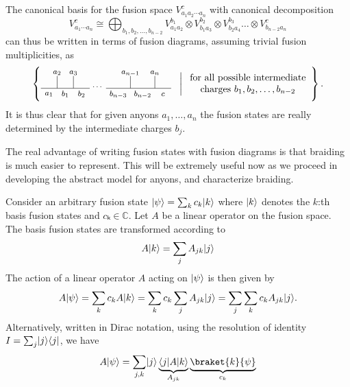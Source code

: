 The canonical basis for the fusion space $V_{a_1a_2\cdots a_n}^c$ with canonical decomposition
\begin{equation}
  V_{a_1 \cdots a_n}^c \cong \bigoplus_{b_1,b_2,\ldots,b_{n-2}} V_{a_1a_2}^{b_1} \otimes V_{b_1 a_3}^{b_2} \otimes V_{b_2 a_4}^{b_3} \ldots \otimes V_{b_{n-2} a_n}^c
\end{equation}
can thus be written in terms of fusion diagrams, assuming trivial fusion multiplicities, as
\begin{equation}
  \left\{
  \begin{tikzpicture}[scale=0.3,font=\footnotesize,anchor=mid,baseline={([yshift=-.5ex]current bounding box.center)}]
    \node at (0, -0.6) {$a_1$};
    \node at (1, 2) {$a_2$};
    \node at (3, 2) {$a_3$};
    \node at (10, 2) {$a_{n-1}$};
    \node at (13, 2) {$a_n$};
%
    \draw (1, 0) to (1, 1.5);
    \draw (3, 0) to (3, 1.5);
%
    \draw (10, 0) to (10, 1.5);
    \draw (13, 0) to (13, 1.5);
%
    \draw (-1, 0) to (5, 0);
    \draw (7, 0) to (15, 0);
%
    \node at (2, -0.7) {$b_1$};
    \node at (4, -0.7) {$b_2$};
    \node at (6, 0.2) {$\cdots$};
%
    \node at (8.5, -0.7) {$b_{n-3}$};
    \node at (11.5, -0.7) {$b_{n-2}$};
    \node at (14, -0.7) {$c$};
  \end{tikzpicture}
  \;\;\;\bigg|\; \begin{array}{c}\text{for all possible intermediate} \\ \text{charges $b_1, b_2, \ldots, b_{n-2}$}\end{array}
  \right\}.
\end{equation}
It is thus clear that for given anyons $a_1, \ldots, a_n$ the fusion states are really determined by the intermediate charges $b_j$.

The real advantage of writing fusion states with fusion diagrams is that braiding is much easier to represent. This will be extremely useful now as we proceed in developing the abstract model for anyons, and characterize braiding.

Consider an arbitrary fusion state $\lvert\psi\rangle = \sum_k c_k \lvert k\rangle$ where $\lvert k\rangle$ denotes the $k$:th basis fusion states and $cₖ∈ℂ$. Let $A$ be a linear operator on the fusion space. The basis fusion states are transformed according to
\begin{equation}\label{eq:linear op on basis state}
  A\lvert k\rangle = \sum_j A_{jk} \lvert j\rangle
\end{equation}
The action of a linear operator $A$ acting on $\lvert\psi\rangle$ is then given by
\begin{equation}
  A \lvert\psi\rangle = \sum_k c_k A \lvert k\rangle = \sum_{k} c_k \sum_j A_{jk} \lvert j\rangle = \sum_j \sum_k c_k A_{jk} \lvert j\rangle.
\end{equation}
Alternatively, written in Dirac notation, using the resolution of identity $I = \sum_j \lvert j\rangle\langle j\rvert$, we have
\begin{equation}
  A \ket{\psi} = \sum_{j,k} \ket{j} \underbrace{\bra{j} A \ket{k}}_{A_{jk}} \underbrace{\braket{k}{\psi}}_{c_k}
\end{equation}


